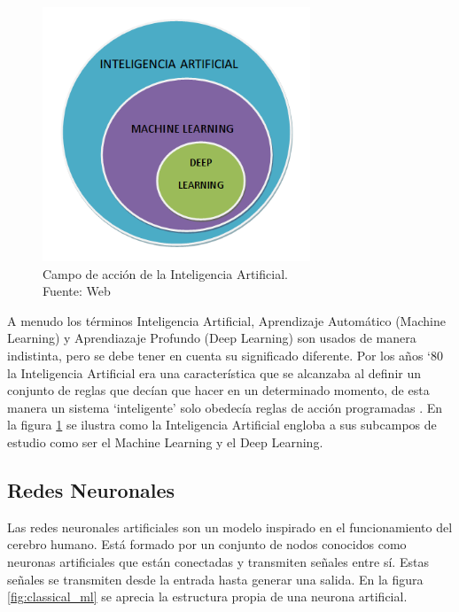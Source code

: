 \begin{figure}[H]
    \begin{center}
        \includegraphics[width=8cm]{img/capitulo_2/ia.png}
    \end{center}
    \caption{Campo de acción de la Inteligencia Artificial.\\Fuente: Web}
    \label{fig:ia}
\end{figure}

A menudo los términos Inteligencia Artificial, Aprendizaje Automático (Machine Learning) y Aprendiazaje Profundo (Deep Learning) son usados de manera indistinta, pero se debe tener en cuenta su significado diferente. Por los años `80 la Inteligencia Artificial era una característica que se alcanzaba al definir un conjunto de reglas que decían que hacer en un determinado momento, de esta manera un sistema `inteligente' solo obedecía reglas de acción programadas \cite{researchgate:ia}. En la figura \ref{fig:ia} se ilustra como la Inteligencia Artificial engloba a sus subcampos de estudio como ser el Machine Learning y el Deep Learning.

\subsection{Redes Neuronales}
Las redes neuronales artificiales son un modelo inspirado en el funcionamiento del cerebro humano. Está formado por un conjunto de nodos conocidos como neuronas artificiales que están conectadas y transmiten señales entre sí. Estas señales se transmiten desde la entrada hasta generar una salida. En la figura \ref{fig:classical_ml} se aprecia la estructura propia de una neurona artificial.\\

